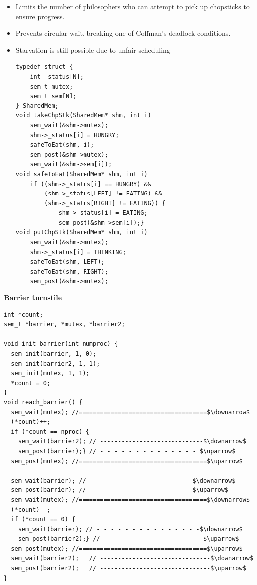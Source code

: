\documentclass[8pt,twocolumn]{article}
\begin{document}
\begin{itemize}
    \setlength{\itemsep}{0pt} %
    \setlength{\parskip}{0pt}
    \item Limits the number of philosophers who can attempt to pick up chopsticks to ensure progress.
    \item Prevents circular wait, breaking one of Coffman’s deadlock conditions.
    \item Starvation is still possible due to unfair scheduling.
\vspace{-0.6em}
\begin{lstlisting}
typedef struct {
    int _status[N];
    sem_t mutex;
    sem_t sem[N]; 
} SharedMem;
void takeChpStk(SharedMem* shm, int i) 
    sem_wait(&shm->mutex);
    shm->_status[i] = HUNGRY;
    safeToEat(shm, i);
    sem_post(&shm->mutex);
    sem_wait(&shm->sem[i]);            
void safeToEat(SharedMem* shm, int i) 
    if ((shm->_status[i] == HUNGRY) &&
        (shm->_status[LEFT] != EATING) &&
        (shm->_status[RIGHT] != EATING)) {
            shm->_status[i] = EATING;
            sem_post(&shm->sem[i]);} 
void putChpStk(SharedMem* shm, int i) 
    sem_wait(&shm->mutex);
    shm->_status[i] = THINKING;
    safeToEat(shm, LEFT);
    safeToEat(shm, RIGHT);
    sem_post(&shm->mutex);            
\end{lstlisting}
\vspace{-1.5em}
\end{itemize}
\textbf{Barrier turnstile}
\vspace{-0.6em}
\begin{lstlisting}[mathescape=true]
int *count;
sem_t *barrier, *mutex, *barrier2;

void init_barrier(int numproc) {
  sem_init(barrier, 1, 0);
  sem_init(barrier2, 1, 1);
  sem_init(mutex, 1, 1);
  *count = 0;
}
void reach_barrier() {
  sem_wait(mutex); //====================================$\downarrow$
  (*count)++;
  if (*count == nproc) {
    sem_wait(barrier2); // -----------------------------$\downarrow$
    sem_post(barrier);} // - - - - - - - - - - - - - - $\uparrow$
  sem_post(mutex); //====================================$\uparrow$

  sem_wait(barrier); // - - - - - - - - - - - - - - -$\downarrow$
  sem_post(barrier); // - - - - - - - - - - - - - - -$\uparrow$
  sem_wait(mutex); //====================================$\downarrow$
  (*count)--;
  if (*count == 0) {
    sem_wait(barrier); // - - - - - - - - - - - - - - -$\downarrow$
    sem_post(barrier2);} // ----------------------------$\uparrow$
  sem_post(mutex); //====================================$\uparrow$
  sem_wait(barrier2);   // -------------------------------$\downarrow$
  sem_post(barrier2);   // -------------------------------$\uparrow$
}
\end{lstlisting}
\end{document}
